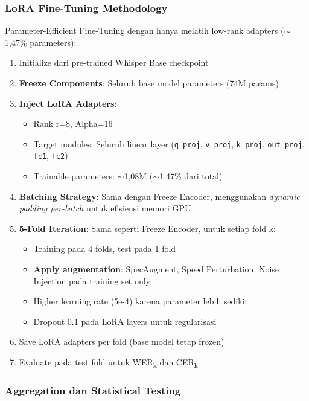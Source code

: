 \subsubsection{LoRA Fine-Tuning Methodology}

Parameter-Efficient Fine-Tuning dengan hanya melatih low-rank adapters ($\sim$1,47\% parameters):

\begin{enumerate}[noitemsep]
    \item Initialize dari pre-trained Whisper Base checkpoint
    \item \textbf{Freeze Components}: Seluruh base model parameters (74M params)
    \item \textbf{Inject LoRA Adapters}:
    \begin{itemize}[noitemsep]
        \item Rank r=8, Alpha=16
        \item Target modules: Seluruh linear layer (\texttt{q\_proj}, \texttt{v\_proj}, \texttt{k\_proj}, \texttt{out\_proj}, \texttt{fc1}, \texttt{fc2})
        \item Trainable parameters: $\sim$1,08M ($\sim$1,47\% dari total)
    \end{itemize}
    \item \textbf{Batching Strategy}: Sama dengan Freeze Encoder, menggunakan \textit{dynamic padding per-batch} untuk efisiensi memori GPU
    \item \textbf{5-Fold Iteration}: Sama seperti Freeze Encoder, untuk setiap fold k:
    \begin{itemize}[noitemsep]
        \item Training pada 4 folds, test pada 1 fold
        \item \textbf{Apply augmentation}: SpecAugment, Speed Perturbation, Noise Injection pada training set only
        \item Higher learning rate (5e-4) karena parameter lebih sedikit
        \item Dropout 0.1 pada LoRA layers untuk regularisasi
    \end{itemize}
    \item Save LoRA adapters per fold (base model tetap frozen)
    \item Evaluate pada test fold untuk WER\textsubscript{k} dan CER\textsubscript{k}
\end{enumerate}

\subsubsection{Aggregation dan Statistical Testing}

